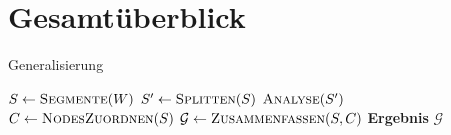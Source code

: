 \documentclass[../main/thesis.tex]{subfiles}
\begin{document}
%				
%				
%				
%	
%	


\section{Gesamtüberblick}

\begin{algorithmhere}{Generalisierung}
\label{alg:Generalisierung}
\begin{algorithmic}
	\State $S \gets \textproc{Segmente}(W)$
	\State $S' \gets \textproc{Splitten}(S)$
	\State $\textproc{Analyse}(S')$
	\State $C \gets \textproc{NodesZuordnen}(S)$
	\State $\mathcal{G} \gets \textproc{Zusammenfassen}(S, C)$
	\State \textbf{Ergebnis} $\mathcal{G}$
\EndFunction
\end{algorithmic}
\end{algorithmhere}
\end{document}
